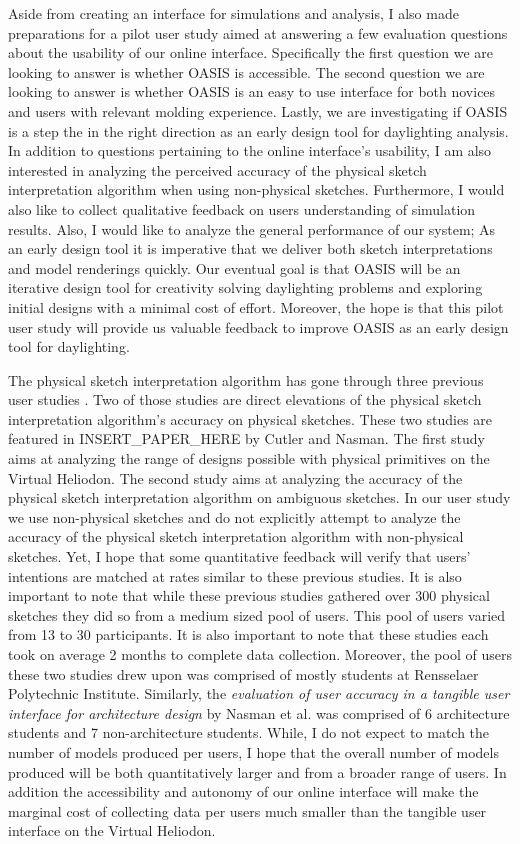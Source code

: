 Aside from creating an interface for simulations and analysis, I also made preparations for a pilot user study aimed at answering a few evaluation questions about the usability of our online interface.
Specifically the first question we are looking to answer is whether OASIS is accessible.
The second question we are looking to answer is whether OASIS is an easy to use interface for both novices and users with relevant molding experience.
Lastly, we are investigating if OASIS is a step the in the right direction as an early design tool for daylighting analysis.
In addition to questions pertaining to the online interface's usability, I am also interested in analyzing the perceived accuracy of the physical sketch interpretation algorithm when using non-physical sketches.
Furthermore, I would also like to collect qualitative feedback on users understanding of simulation results.
Also, I would like to analyze the general performance of our system;
As an early design tool it is imperative that we deliver both sketch interpretations and model renderings quickly.
Our eventual goal is that OASIS will be an iterative design tool for creativity solving daylighting problems and exploring initial designs with a minimal cost of effort.
Moreover, the hope is that this pilot user study will provide us valuable feedback to improve OASIS as an early design tool for daylighting.

The physical sketch interpretation algorithm has gone through three previous user studies \cite{}.
Two of those studies are direct elevations of the physical sketch interpretation algorithm's accuracy on physical sketches.
These two studies are featured in INSERT_PAPER_HERE by Cutler and Nasman.
The first study aims at analyzing the range of designs possible with physical primitives on the Virtual Heliodon.
The second study aims at analyzing the accuracy of the physical sketch interpretation algorithm on ambiguous sketches.
In our user study we use non-physical sketches and do not explicitly attempt to analyze the accuracy of the physical sketch interpretation algorithm with non-physical sketches. Yet, I hope that some quantitative feedback will verify that users' intentions are matched at rates similar to these previous studies.
It is also important to note that while these previous studies gathered over 300 physical sketches they did so from a medium sized pool of users.
This pool of users varied from 13 to 30 participants.
It is also important to note that these studies each took on average 2 months to complete data collection. Moreover, the pool of users these two studies drew upon was comprised of mostly students at Rensselaer Polytechnic Institute.
Similarly, the \textit{evaluation of user accuracy in a tangible user interface for architecture design} by Nasman et al. was comprised of 6 architecture students and 7 non-architecture students. While, I do not expect to match the number of models produced per users, I hope that the overall number of models produced will be both quantitatively larger and from a broader range of users.
In addition the accessibility and autonomy of our online interface will make the marginal cost of collecting data per users much smaller than the tangible user interface on the Virtual Heliodon.


